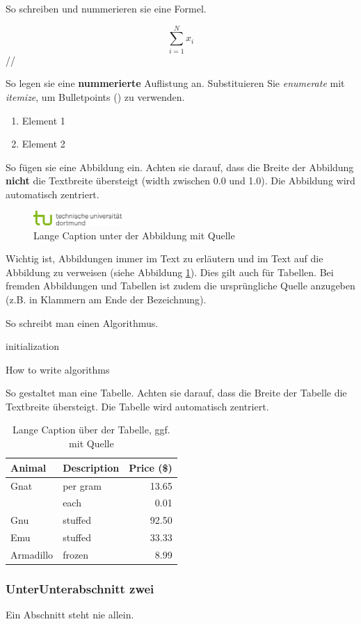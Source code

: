 \newpage
So schreiben und nummerieren sie eine Formel.

\begin{equation}
    \sum_{i=1}^N x_i
    \label{eq:1}
\end{equation}
\newline//

So legen sie eine \textbf{nummerierte} Auflistung an. Substituieren Sie \textit{enumerate} mit \textit{itemize}, um Bulletpoints (\textbullet) zu verwenden.

\begin{enumerate}
\item Element 1
\item Element 2
\end{enumerate}

So fügen sie eine Abbildung ein. Achten sie darauf, dass die Breite der Abbildung \textbf{nicht} die Textbreite übersteigt (width zwischen 0.0 und 1.0). Die Abbildung wird automatisch zentriert.

\begin{figure}[H]
    \centering
    \includegraphics[width=0.3\textwidth]{abbildungen/tud_logo_rgb.jpg}
    \caption[Kurze Caption für Inhaltsverzeichnis]{Lange Caption unter der Abbildung mit Quelle}
    \label{fig:my_label}
\end{figure}

Wichtig ist, Abbildungen immer im Text zu erläutern und im Text auf die Abbildung zu verweisen (siehe Abbildung \ref{fig:my_label}). Dies gilt auch für Tabellen. Bei fremden Abbildungen und Tabellen ist zudem die ursprüngliche Quelle anzugeben (z.B. in Klammern am Ende der Bezeichnung).

So schreibt man einen Algorithmus.
\BlankLine
\begin{algorithm}[H]
 initialization\;
 \caption{How to write algorithms}
\end{algorithm}
\BlankLine
\BlankLine
So gestaltet man eine Tabelle. Achten sie darauf, dass die Breite der Tabelle die Textbreite übersteigt. Die Tabelle wird automatisch zentriert.
\begin{table}[H]
\caption[Kurze Caption für Inhaltsverzeichnis]{Lange Caption über der Tabelle, ggf. mit Quelle}
\centering
\begin{tabular}{llr}
\hline
Animal    & Description & Price (\$) \\
\hline
Gnat      & per gram    & 13.65      \\
          & each        & 0.01       \\
Gnu       & stuffed     & 92.50      \\
Emu       & stuffed     & 33.33      \\
Armadillo & frozen      & 8.99       \\
\hline
\end{tabular}
\end{table}

\subsubsection{UnterUnterabschnitt zwei}

Ein Abschnitt steht nie allein.